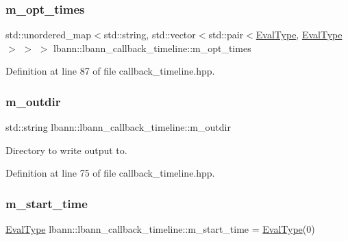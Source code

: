\subsubsection{\texorpdfstring{m\+\_\+opt\+\_\+times}{m\_opt\_times}}
{\footnotesize\ttfamily std\+::unordered\+\_\+map$<$std\+::string, std\+::vector$<$std\+::pair$<$\hyperlink{base_8hpp_a3266f5ac18504bbadea983c109566867}{Eval\+Type}, \hyperlink{base_8hpp_a3266f5ac18504bbadea983c109566867}{Eval\+Type}$>$ $>$ $>$ lbann\+::lbann\+\_\+callback\+\_\+timeline\+::m\+\_\+opt\+\_\+times\hspace{0.3cm}{\ttfamily [private]}}



Definition at line 87 of file callback\+\_\+timeline.\+hpp.

\mbox{\label{classlbann_1_1lbann__callback__timeline_afb064216a569f0763b2fff4ab5547790}} 
\subsubsection{\texorpdfstring{m\+\_\+outdir}{m\_outdir}}
{\footnotesize\ttfamily std\+::string lbann\+::lbann\+\_\+callback\+\_\+timeline\+::m\+\_\+outdir\hspace{0.3cm}{\ttfamily [private]}}



Directory to write output to. 



Definition at line 75 of file callback\+\_\+timeline.\+hpp.

\mbox{\label{classlbann_1_1lbann__callback__timeline_a624a9b00735fb7644d544ec6ed83dd27}} 
\subsubsection{\texorpdfstring{m\+\_\+start\+\_\+time}{m\_start\_time}}
{\footnotesize\ttfamily \hyperlink{base_8hpp_a3266f5ac18504bbadea983c109566867}{Eval\+Type} lbann\+::lbann\+\_\+callback\+\_\+timeline\+::m\+\_\+start\+\_\+time = \hyperlink{base_8hpp_a3266f5ac18504bbadea983c109566867}{Eval\+Type}(0)\hspace{0.3cm}{\ttfamily [private]}}



